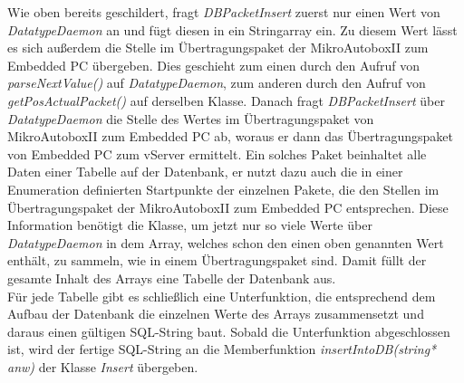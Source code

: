 \documentclass[fontsize = 12pt, paper = a4]{scrreprt}
\begin{document}
Wie oben bereits geschildert, fragt \textit{DBPacketInsert} zuerst nur einen Wert von \textit{DatatypeDaemon} an und fügt diesen in ein Stringarray ein. Zu diesem Wert lässt es sich außerdem die Stelle im Übertragungspaket der MikroAutoboxII zum Embedded PC übergeben. Dies geschieht zum einen durch den Aufruf von \textit{parseNextValue()} auf \textit{DatatypeDaemon}, zum anderen durch den Aufruf von \textit{getPosActualPacket()} auf derselben Klasse. Danach fragt \textit{DBPacketInsert} über \textit{DatatypeDaemon} die Stelle des Wertes im Übertragungspaket von MikroAutoboxII zum Embedded PC ab, woraus er dann das Übertragungspaket von Embedded PC zum vServer ermittelt. Ein solches Paket beinhaltet alle Daten einer Tabelle auf der Datenbank, er nutzt dazu auch die in einer Enumeration definierten Startpunkte der einzelnen Pakete, die den Stellen im Übertragungspaket der MikroAutoboxII zum Embedded PC entsprechen. Diese Information benötigt die Klasse, um jetzt nur so viele Werte über \textit{DatatypeDaemon} in dem Array, welches schon den einen oben genannten Wert enthält, zu sammeln, wie in einem Übertragungspaket sind. Damit füllt der gesamte Inhalt des Arrays eine Tabelle der Datenbank aus.\\
Für jede Tabelle gibt es schließlich eine Unterfunktion, die entsprechend dem Aufbau der Datenbank die einzelnen Werte des Arrays zusammensetzt und daraus einen gültigen SQL-String baut. Sobald die Unterfunktion abgeschlossen ist, wird der fertige SQL-String an die Memberfunktion \textit{insertIntoDB(string* anw)} der Klasse \textit{Insert} übergeben.\\

\end{document}
